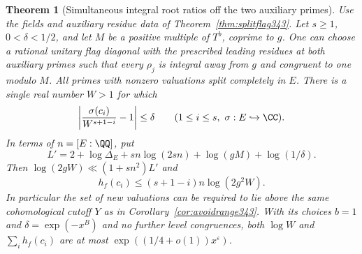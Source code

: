 \documentclass[a4paper,11pt]{article}
\newtheorem{theorem}[proposition]{Theorem}
\theoremstyle{definition}
\theoremstyle{remark}
\numberwithin{equation}{section}
\begin{document}
\begin{theorem}[Simultaneous integral root ratios off the two auxiliary primes]\leavevmode\label{thm:dominantflag344}
Use the fields and auxiliary residue data of
Theorem~\ref{thm:splitflag343}. Let $s\ge1$, $0<\delta<1/2$, and
let $M$ be a positive multiple of $T^b$, coprime to $g$. One can
choose a rational unitary flag diagonal with the prescribed leading
residues at both auxiliary primes such that every $\rho_j$ is
integral away from $g$ and congruent to one modulo $M$. All primes
with nonzero valuations split completely in $E$. There is a
single real number $W>1$ for which
\[
      \left|\frac{\sigma(c_i)}{W^{s+1-i}}-1\right|\le\delta
                     \qquad(1\le i\le s,\ \sigma:E\hookrightarrow\CC).
\]
In terms of $n=[E:\QQ]$, put
\[
    L'=2+\log\Delta_E+sn\log(2sn)+\log(gM)+\log(1/\delta).
\]
Then $\log(2gW)\ll(1+sn^2)L'$ and
\[
           h_f(c_i)\le (s+1-i)n\log(2g^2W).
\]
In particular the set of new valuations can be required to lie
above the same cohomological cutoff $Y$ as in
Corollary~\ref{cor:avoidrange343}. With its choices $b=1$ and
$\delta=\exp(-x^B)$ and no further level congruences, both $\log W$
and $\sum_i h_f(c_i)$ are at most $\exp((1/4+o(1))x^\varepsilon)$.
\end{theorem}
\end{document}
